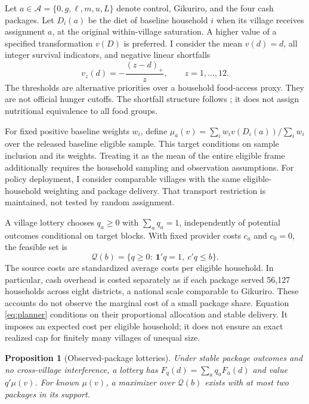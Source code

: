 \documentclass[11pt]{article}
\newtheorem{proposition}{Proposition}
\begin{document}
Let $a\in\mathcal A=\{0,g,\ell,m,u,L\}$ denote control, Gikuriro, and the four cash packages. Let $D_i(a)$ be the diet of baseline household $i$ when its village receives assignment $a$, at the original within-village saturation. A higher value of a specified transformation $v(D)$ is preferred. I consider the mean $v(d)=d$, all integer survival indicators, and negative linear shortfalls
\begin{equation}
 v_z(d)=-\frac{(z-d)_+}{z},\qquad z=1,\ldots,12.\label{eq:shortfall}
\end{equation}
The thresholds are alternative priorities over a household food-access proxy. They are not official hunger cutoffs. The shortfall structure follows \citet{foster1984}; it does not assign nutritional equivalence to all food groups.

For fixed positive baseline weights $w_i$, define $\mu_a(v)=\sum_iw_i v(D_i(a))/\sum_iw_i$ over the released baseline eligible sample. This target conditions on sample inclusion and its weights. Treating it as the mean of the entire eligible frame additionally requires the household sampling and observation assumptions. For policy deployment, I consider comparable villages with the same eligible-household weighting and package delivery. That transport restriction is maintained, not tested by random assignment.

A village lottery chooses $q_a\geq0$ with $\sum_aq_a=1$, independently of potential outcomes conditional on target blocks. With fixed provider costs $c_a$ and $c_0=0$, the feasible set is
\begin{equation}
 \mathcal Q(b)=\{q\geq0:\ \boldsymbol1'q=1,\ c'q\leq b\}.\label{eq:planner}
\end{equation}
The source costs are standardized average costs per eligible household. In particular, cash overhead is costed separately as if each package served 56,127 households across eight districts, a national scale comparable to Gikuriro. These accounts do not observe the marginal cost of a small package share. Equation \eqref{eq:planner} conditions on their proportional allocation and stable delivery. It imposes an expected cost per eligible household; it does not ensure an exact realized cap for finitely many villages of unequal size.

\begin{proposition}[Observed-package lotteries]\label{prop:vertices}
Under stable package outcomes and no cross-village interference, a lottery has $F_q(d)=\sum_aq_aF_a(d)$ and value $q'\mu(v)$. For known $\mu(v)$, a maximizer over $\mathcal Q(b)$ exists with at most two packages in its support.
\end{proposition}
\end{document}
